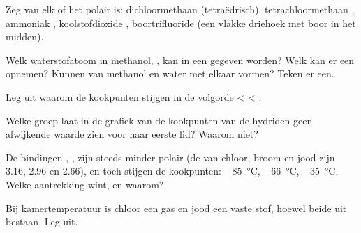 \begin{exercise}[$\star\star$]\label{exo:g11:polarity-and-cohesion:6}
Zeg van elk  of het polair is: dichloormethaan 
(tetraëdrisch), tetrachloormethaan , ammoniak ,
koolstofdioxide , boortrifluoride  (een vlakke driehoek
met boor in het midden).
\end{exercise}

\begin{exercise}[$\star\star$]\label{exo:g11:polarity-and-cohesion:7}
Welk waterstofatoom in methanol, , kan in een 
gegeven worden? Welk  kan er een opnemen? Kunnen  van
methanol en water  met elkaar vormen? Teken er een.
\end{exercise}

\begin{exercise}[$\star\star$]\label{exo:g11:polarity-and-cohesion:8}
Leg uit waarom de kookpunten stijgen in de volgorde  <
 < .
\end{exercise}

\begin{exercise}[$\star\star$]\label{exo:g11:polarity-and-cohesion:9}
Welke groep laat in de grafiek van de kookpunten van de hydriden geen
afwijkende waarde zien voor haar eerste lid? Waarom niet?
\end{exercise}

\begin{exercise}[$\star\star$]\label{exo:g11:polarity-and-cohesion:10}
De bindingen , ,  zijn steeds minder polair (de
 van chloor, broom en jood zijn 3.16, 2.96 en
2.66), en toch stijgen de kookpunten: \qty{-85}{\celsius},
\qty{-66}{\celsius}, \qty{-35}{\celsius}. Welke aantrekking wint, en
waarom?
\end{exercise}

\begin{exercise}[$\star\star$]\label{exo:g11:polarity-and-cohesion:11}
Bij kamertemperatuur is chloor een gas en jood een vaste stof, hoewel
beide uit   bestaan. Leg uit.
\end{exercise}

